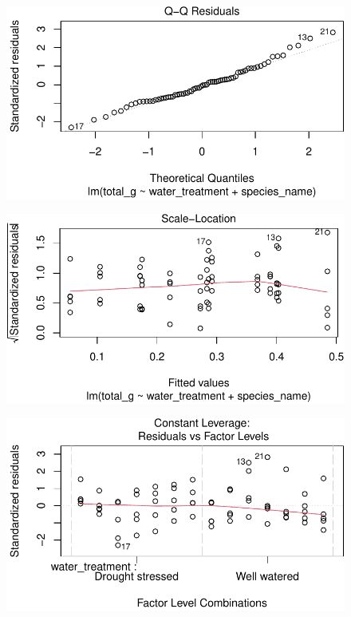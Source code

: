 \documentclass[
  letterpaper,
  DIV=11,
  numbers=noendperiod]{scrartcl}
\begin{document}
\begin{figure}[H]

{\centering \includegraphics{Odile_Gabbiani_homework-03_files/figure-pdf/unnamed-chunk-11-2.pdf}

}

\end{figure}

\begin{figure}[H]

{\centering \includegraphics{Odile_Gabbiani_homework-03_files/figure-pdf/unnamed-chunk-11-3.pdf}

}

\end{figure}

\begin{figure}[H]

{\centering \includegraphics{Odile_Gabbiani_homework-03_files/figure-pdf/unnamed-chunk-11-4.pdf}

}

\end{figure}
\end{document}
